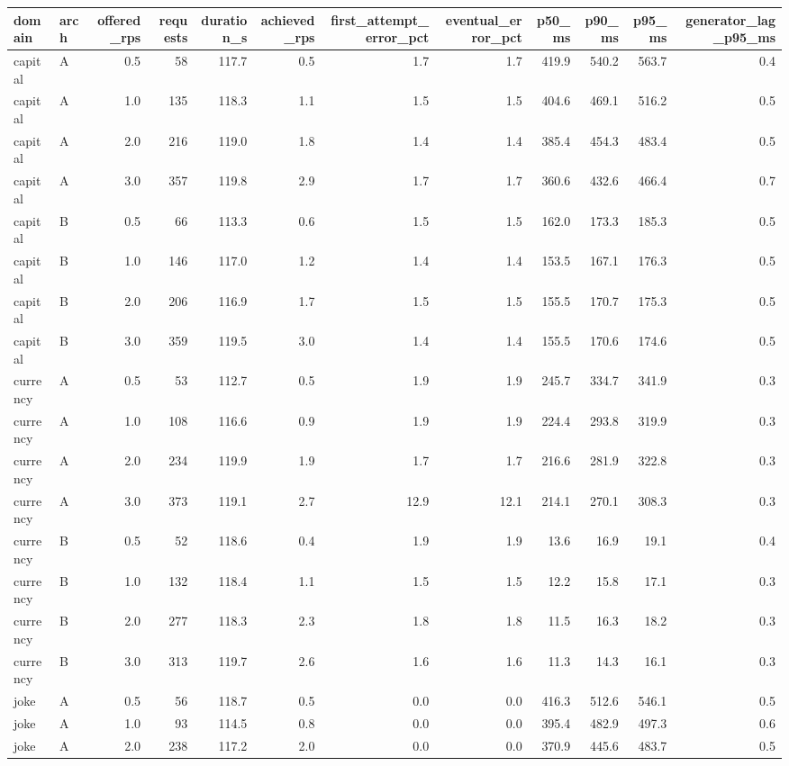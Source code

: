 \begin{tabular}{llrrrrrrrrrr}
\toprule
domain & arch & offered_rps & requests & duration_s & achieved_rps & first_attempt_error_pct & eventual_error_pct & p50_ms & p90_ms & p95_ms & generator_lag_p95_ms \\
\midrule
capital & A & 0.5 & 58 & 117.7 & 0.5 & 1.7 & 1.7 & 419.9 & 540.2 & 563.7 & 0.4 \\
capital & A & 1.0 & 135 & 118.3 & 1.1 & 1.5 & 1.5 & 404.6 & 469.1 & 516.2 & 0.5 \\
capital & A & 2.0 & 216 & 119.0 & 1.8 & 1.4 & 1.4 & 385.4 & 454.3 & 483.4 & 0.5 \\
capital & A & 3.0 & 357 & 119.8 & 2.9 & 1.7 & 1.7 & 360.6 & 432.6 & 466.4 & 0.7 \\
capital & B & 0.5 & 66 & 113.3 & 0.6 & 1.5 & 1.5 & 162.0 & 173.3 & 185.3 & 0.5 \\
capital & B & 1.0 & 146 & 117.0 & 1.2 & 1.4 & 1.4 & 153.5 & 167.1 & 176.3 & 0.5 \\
capital & B & 2.0 & 206 & 116.9 & 1.7 & 1.5 & 1.5 & 155.5 & 170.7 & 175.3 & 0.5 \\
capital & B & 3.0 & 359 & 119.5 & 3.0 & 1.4 & 1.4 & 155.5 & 170.6 & 174.6 & 0.5 \\
currency & A & 0.5 & 53 & 112.7 & 0.5 & 1.9 & 1.9 & 245.7 & 334.7 & 341.9 & 0.3 \\
currency & A & 1.0 & 108 & 116.6 & 0.9 & 1.9 & 1.9 & 224.4 & 293.8 & 319.9 & 0.3 \\
currency & A & 2.0 & 234 & 119.9 & 1.9 & 1.7 & 1.7 & 216.6 & 281.9 & 322.8 & 0.3 \\
currency & A & 3.0 & 373 & 119.1 & 2.7 & 12.9 & 12.1 & 214.1 & 270.1 & 308.3 & 0.3 \\
currency & B & 0.5 & 52 & 118.6 & 0.4 & 1.9 & 1.9 & 13.6 & 16.9 & 19.1 & 0.4 \\
currency & B & 1.0 & 132 & 118.4 & 1.1 & 1.5 & 1.5 & 12.2 & 15.8 & 17.1 & 0.3 \\
currency & B & 2.0 & 277 & 118.3 & 2.3 & 1.8 & 1.8 & 11.5 & 16.3 & 18.2 & 0.3 \\
currency & B & 3.0 & 313 & 119.7 & 2.6 & 1.6 & 1.6 & 11.3 & 14.3 & 16.1 & 0.3 \\
joke & A & 0.5 & 56 & 118.7 & 0.5 & 0.0 & 0.0 & 416.3 & 512.6 & 546.1 & 0.5 \\
joke & A & 1.0 & 93 & 114.5 & 0.8 & 0.0 & 0.0 & 395.4 & 482.9 & 497.3 & 0.6 \\
joke & A & 2.0 & 238 & 117.2 & 2.0 & 0.0 & 0.0 & 370.9 & 445.6 & 483.7 & 0.5 \\

\end{tabular}
